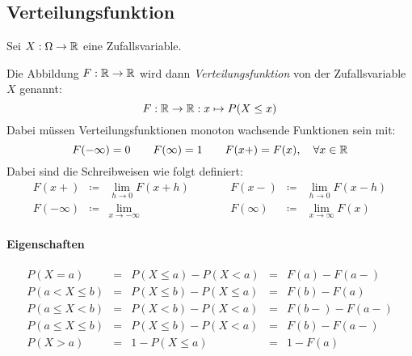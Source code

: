         \subsection{Verteilungsfunktion}
            Sei \( X : \Omega \rightarrow \mathbb{R} \) eine Zufallsvariable.
            
            Die Abbildung \( F : \mathbb{R} \rightarrow \mathbb{R} \) wird dann \textit{Verteilungsfunktion} von der Zufallsvariable \(X\) genannt:
            \begin{equation*}
                F : \mathbb{R} \rightarrow \mathbb{R} : x \mapsto P(X \leq x)
            \end{equation*}
            Dabei müssen Verteilungsfunktionen monoton wachsende Funktionen sein mit:
            \begin{equation*}
	            F(-\infty) = 0 \qquad F(\infty) = 1 \qquad F(x+) = F(x), \quad \forall x \in \mathbb{R}
            \end{equation*}
            Dabei sind die Schreibweisen wie folgt definiert:
            \begin{equation*}
	            \begin{array}{rclcrcl}
	            	     F(x+) & \coloneqq & \lim\limits_{h \rightarrow 0} F(x + h) & \qquad &     F(x-) & \coloneqq & \lim\limits_{h \rightarrow 0} F(x - h)  \\
	            	F(-\infty) & \coloneqq & \lim\limits_{x \rightarrow -\infty}    & \qquad & F(\infty) & \coloneqq & \lim\limits_{x \rightarrow \infty} F(x)
	            \end{array}
            \end{equation*}
            
            \paragraph{Eigenschaften}
	            \begin{equation*}
		            \begin{array}{rclcl}
		            	          P(X = a) & = & P(X \leq a) - P(X < a)    & = & F(a) - F(a-)  \\
		            	   P(a < X \leq b) & = & P(X \leq b) - P(X \leq a) & = & F(b) - F(a)   \\
		            	   P(a \leq X < b) & = & P(X < b) - P(X < a)       & = & F(b-) - F(a-) \\
		            	P(a \leq X \leq b) & = & P(X \leq b) - P(X < a)    & = & F(b) - F(a-)  \\
		            	          P(X > a) & = & 1 - P(X \leq a)           & = & 1 - F(a)
		            \end{array}
	            \end{equation*}

